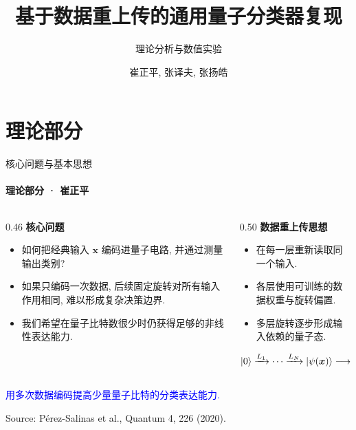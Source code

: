 \documentclass{ctexbeamer}
\title[数据重上传量子分类器复现]{基于数据重上传的通用量子分类器复现}
\subtitle{理论分析与数值实验}
\author[崔正平, 张译夫, 张扬皓]{崔正平, 张译夫, 张扬皓}
\institute[]{课程大作业汇报}
\date{}
\begin{document}
\begin{frame}
    \titlepage
\end{frame}

\section{理论部分}

\begin{frame}{核心问题与基本思想}
    \framesubtitle{理论部分 · 崔正平}
    \begin{columns}[T]
        \begin{column}{0.46\textwidth}
            \textbf{核心问题}
            \begin{itemize}
                \setlength{\itemsep}{1.0ex}
                \item 如何把经典输入 $\bm{x}$ 编码进量子电路, 并通过测量输出类别?
                \item 如果只编码一次数据, 后续固定旋转对所有输入作用相同, 难以形成复杂决策边界.
                \item 我们希望在量子比特数很少时仍获得足够的非线性表达能力.
            \end{itemize}
        \end{column}
        \begin{column}{0.50\textwidth}
            \textbf{数据重上传思想}
            \begin{itemize}
                \setlength{\itemsep}{1.0ex}
                \item 在每一层重新读取同一个输入.
                \item 各层使用可训练的数据权重与旋转偏置.
                \item 多层旋转逐步形成输入依赖的量子态.
            \end{itemize}
            \[
                \ket{0}\xrightarrow{L_1}\cdots
                \xrightarrow{L_N}\ket{\psi(\bm{x})}
                \longrightarrow\widehat c .
            \]
        \end{column}
    \end{columns}
    \vspace{0.4em}
    \begin{center}
        \textcolor{blue}{用多次数据编码提高少量量子比特的分类表达能力.}
    \end{center}
    \vfill
    {\tiny Source: Pérez-Salinas et al., Quantum 4, 226 (2020).}
\end{frame}
\end{document}
